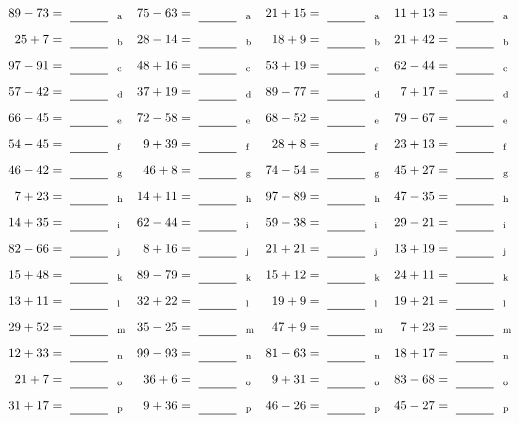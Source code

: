 \documentclass
[
  draft    = true,
  fontsize = 11pt,
  parskip  = half-
]
{scrartcl}
\begin{document}
\clearpage
\begin{align*}
    \pline{89-73}&=\rline{a}
  & \pline{75-63}&=\rline{a}
  & \pline{21+15}&=\rline{a}
  & \pline{11+13}&=\rline{a} \\[1ex]
    \pline{25+7}&=\rline{b}
  & \pline{28-14}&=\rline{b}
  & \pline{18+9}&=\rline{b}
  & \pline{21+42}&=\rline{b} \\[1ex]
    \pline{97-91}&=\rline{c}
  & \pline{48+16}&=\rline{c}
  & \pline{53+19}&=\rline{c}
  & \pline{62-44}&=\rline{c} \\[1ex]
    \pline{57-42}&=\rline{d}
  & \pline{37+19}&=\rline{d}
  & \pline{89-77}&=\rline{d}
  & \pline{7+17}&=\rline{d} \\[1ex]
    \pline{66-45}&=\rline{e}
  & \pline{72-58}&=\rline{e}
  & \pline{68-52}&=\rline{e}
  & \pline{79-67}&=\rline{e} \\[1ex]
    \pline{54-45}&=\rline{f}
  & \pline{9+39}&=\rline{f}
  & \pline{28+8}&=\rline{f}
  & \pline{23+13}&=\rline{f} \\[1ex]
    \pline{46-42}&=\rline{g}
  & \pline{46+8}&=\rline{g}
  & \pline{74-54}&=\rline{g}
  & \pline{45+27}&=\rline{g} \\[1ex]
    \pline{7+23}&=\rline{h}
  & \pline{14+11}&=\rline{h}
  & \pline{97-89}&=\rline{h}
  & \pline{47-35}&=\rline{h} \\[1ex]
    \pline{14+35}&=\rline{i}
  & \pline{62-44}&=\rline{i}
  & \pline{59-38}&=\rline{i}
  & \pline{29-21}&=\rline{i} \\[1ex]
    \pline{82-66}&=\rline{j}
  & \pline{8+16}&=\rline{j}
  & \pline{21+21}&=\rline{j}
  & \pline{13+19}&=\rline{j} \\[1ex]
    \pline{15+48}&=\rline{k}
  & \pline{89-79}&=\rline{k}
  & \pline{15+12}&=\rline{k}
  & \pline{24+11}&=\rline{k} \\[1ex]
    \pline{13+11}&=\rline{l}
  & \pline{32+22}&=\rline{l}
  & \pline{19+9}&=\rline{l}
  & \pline{19+21}&=\rline{l} \\[1ex]
    \pline{29+52}&=\rline{m}
  & \pline{35-25}&=\rline{m}
  & \pline{47+9}&=\rline{m}
  & \pline{7+23}&=\rline{m} \\[1ex]
    \pline{12+33}&=\rline{n}
  & \pline{99-93}&=\rline{n}
  & \pline{81-63}&=\rline{n}
  & \pline{18+17}&=\rline{n} \\[1ex]
    \pline{21+7}&=\rline{o}
  & \pline{36+6}&=\rline{o}
  & \pline{9+31}&=\rline{o}
  & \pline{83-68}&=\rline{o} \\[1ex]
    \pline{31+17}&=\rline{p}
  & \pline{9+36}&=\rline{p}
  & \pline{46-26}&=\rline{p}
  & \pline{45-27}&=\rline{p}
\end{align*}
\end{document}
